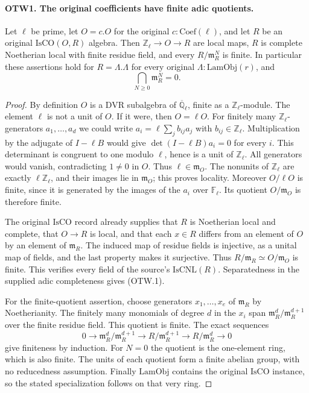 \paragraph{OTW1. The original coefficients have finite adic quotients.}
\label{claim:OTW1}
Let $\ell$ be prime, let $O=c.O$ for the original
$c:\mathrm{Coef}(\ell)$, and let $R$ be an original
$\mathrm{IsCO}(O,R)$ algebra.  Then $\mathbb Z_\ell\to O\to R$
are local maps, $R$ is complete Noetherian local with finite residue
field, and every $R/\mathfrak m_R^N$ is finite.  In particular
these assertions hold for $R=\Lambda.\Lambda$ for every original
$\Lambda:\mathrm{LamObj}(r)$, and
\[
                 \bigcap_{N\geq0}\mathfrak m_R^N=0.
                 \tag{OTW.1}
\]
\begin{proof}
By definition $O$ is a DVR subalgebra of
$\overline{\mathbb Q}_\ell$, finite as a $\mathbb Z_\ell$-module.
The element $\ell$ is not a unit of $O$.  If it were, then
$O=\ell O$.  For finitely many $\mathbb Z_\ell$-generators
$a_1,\ldots,a_d$ we could write
$a_i=\ell\sum_j b_{ij}a_j$ with $b_{ij}\in\mathbb Z_\ell$.
Multiplication by the adjugate of $I-\ell B$ would give
$\det(I-\ell B)a_i=0$ for every $i$.  This determinant is congruent
to one modulo $\ell$, hence is a unit of $\mathbb Z_\ell$.
All generators would vanish, contradicting $1\ne0$ in $O$.
Thus $\ell\in\mathfrak m_O$.  The nonunits of
$\mathbb Z_\ell$ are exactly $\ell\mathbb Z_\ell$, and their
images lie in $\mathfrak m_O$; this proves locality.  Moreover
$O/\ell O$ is finite, since it is generated by the images of the
$a_i$ over $\mathbb F_\ell$.  Its quotient $O/\mathfrak m_O$
is therefore finite.

The original $\mathrm{IsCO}$ record already supplies that $R$ is
Noetherian local and complete, that $O\to R$ is local, and that
each $x\in R$ differs from an element of $O$ by an element of
$\mathfrak m_R$.  The induced map of residue fields is injective,
as a unital map of fields, and the last property makes it surjective.
Thus $R/\mathfrak m_R\simeq O/\mathfrak m_O$ is finite.
This verifies every field of the source's $\mathrm{IsCNL}(R)$.
Separatedness in the supplied adic completeness gives (OTW.1).

For the finite-quotient assertion, choose generators
$x_1,\ldots,x_e$ of $\mathfrak m_R$ by Noetherianity.
The finitely many monomials of degree $d$ in the $x_i$ span
$\mathfrak m_R^d/\mathfrak m_R^{d+1}$ over the finite residue
field.  This quotient is finite.  The exact sequences
\[
 0\longrightarrow\mathfrak m_R^d/\mathfrak m_R^{d+1}
 \longrightarrow R/\mathfrak m_R^{d+1}
 \longrightarrow R/\mathfrak m_R^d\longrightarrow0
 \tag{OTW.2}
\]
give finiteness by induction.  For $N=0$ the quotient is the
one-element ring, which is also finite.  The units of each quotient
form a finite abelian group, with no reducedness assumption.
Finally $\mathrm{LamObj}$ contains the original $\mathrm{IsCO}$
instance, so the stated specialization follows on that very ring.
\end{proof}

